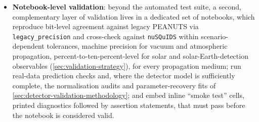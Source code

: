 \begin{itemize}
  \item \textbf{Notebook-level validation}: beyond the automated test suite, a second, complementary layer of validation lives in a dedicated set of notebooks, which reproduce bit-level agreement against legacy PEANUTS via \texttt{legacy\_precision} and cross-check against \texttt{nuSQuIDS} \parencite{nuSQuIDS} within scenario-dependent tolerances, machine precision for vacuum and atmospheric propagation, percent-to-ten-percent-level for solar and solar-Earth-detection observables (\cref{sec:validation-strategy}), for every propagation medium; run real-data prediction checks and, where the detector model is sufficiently complete, the normalisation audits and parameter-recovery fits of \cref{sec:detector-validation-methodology}; and embed inline \enquote{smoke test} cells, printed diagnostics followed by assertion statements, that must pass before the notebook is considered valid.
\end{itemize}
